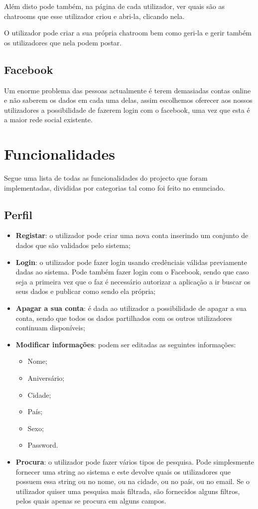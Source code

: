 \documentclass[a4paper, 12pt]{article}
\begin{document}
Além disto pode também, na página de cada utilizador, ver quais são as chatrooms que esse utilizador criou e abri-la, clicando nela.

O utilizador pode criar a sua própria chatroom bem como geri-la e gerir também os utilizadores que nela podem postar.

\subsection{Facebook}
\indent \indent Um enorme problema das pessoas actualmente é terem demasiadas contas online e não saberem os dados em cada uma delas, assim escolhemos oferecer aos nossos utilizadores a possibilidade de fazerem login com o facebook, uma vez que esta é a maior rede social existente.
\cleardoublepage


\section{Funcionalidades}
\indent \indent Segue uma lista de todas as funcionalidades do projecto que foram implementadas, divididas por categorias tal como foi feito no enunciado.

\subsection{Perfil}
\begin{itemize}
	\item \textbf{Registar}: o utilizador pode criar uma nova conta inserindo um conjunto de dados que são validados pelo sistema;
	\item \textbf{Login}: o utilizador pode fazer login usando credênciais válidas previamente dadas ao sistema. Pode também fazer login com o Facebook, sendo que caso seja a primeira vez que o faz é necessário autorizar a aplicação a ir buscar os seus dados e publicar como sendo ela própria;
	\item \textbf{Apagar a sua conta}: é dada ao utilizador a possibilidade de apagar a sua conta, sendo que todos os dados partilhados com os outros utilizadores continuam disponíveis;
	\item \textbf{Modificar informações}: podem ser editadas as seguintes informações:
	\begin{itemize}
		\item Nome;
		\item Aniversário;
		\item Cidade;
		\item País;
		\item Sexo;
		\item Password.
	\end{itemize}
	\item \textbf{Procura}: o utilizador pode fazer vários tipos de pesquisa. Pode simplesmente fornecer uma string ao sistema e este devolve quais os utilizadores que possuem essa string ou no nome, ou na cidade, ou no país, ou no email. Se o utilizador quiser uma pesquisa mais filtrada, são fornecidos alguns filtros, pelos quais apenas se procura em alguns campos.
\end{itemize}
\end{document}
